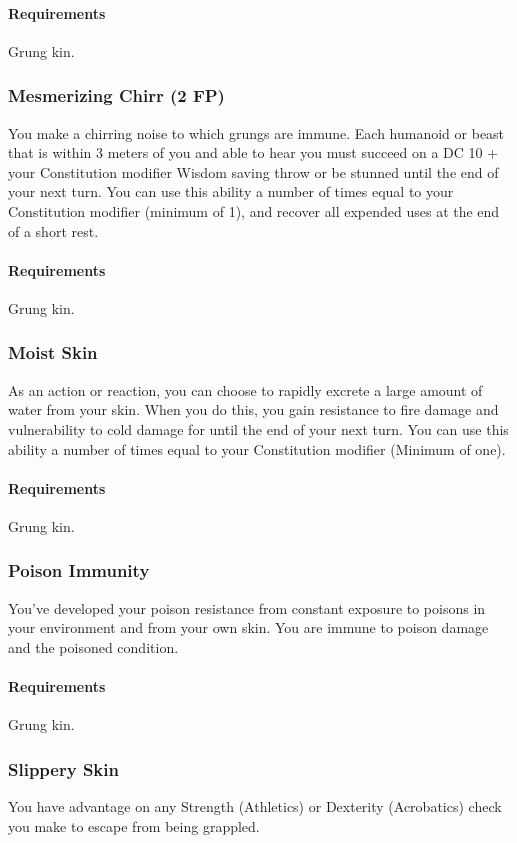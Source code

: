         \paragraph{Requirements} Grung kin.
    \subsubsection{Mesmerizing Chirr (2 FP)} \label{feat::mesmerizingchirr}
        You make a chirring noise to which grungs are immune.
        Each humanoid or beast that is within 3 meters of you and able to hear you must succeed on a DC 10 + your Constitution modifier Wisdom saving throw or be stunned until the end of your next turn.
        You can use this ability a number of times equal to your Constitution modifier (minimum of 1), and recover all expended uses at the end of a short rest.
        \paragraph{Requirements} Grung kin.
    \subsubsection{Moist Skin} \label{feat::moistskin}
        As an action or reaction, you can choose to rapidly excrete a large amount of water from your skin.
        When you do this, you gain resistance to fire damage and vulnerability to cold damage for until the end of your next turn.
        You can use this ability a number of times equal to your Constitution modifier (Minimum of one).
        \paragraph{Requirements} Grung kin.
    \subsubsection{Poison Immunity} \label{feat::poisonimmunity}
        You've developed your poison resistance from constant exposure to poisons in your environment and from your own skin.
        You are immune to poison damage and the poisoned condition.
        \paragraph{Requirements} Grung kin.
    \subsubsection{Slippery Skin} \label{feat::slipperyskin}
        You have advantage on any Strength (Athletics) or Dexterity (Acrobatics) check you make to escape from being grappled.
